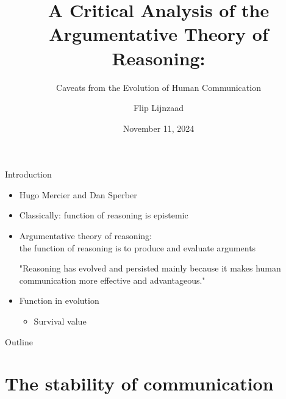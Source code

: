 \documentclass[xcolor=table]{beamer}       %
\title{A Critical Analysis of the Argumentative Theory of Reasoning:}
\subtitle{Caveats from the Evolution of Human Communication}
\author{Flip Lijnzaad}
\date{November 11, 2024}
\begin{document}
\maketitle

\begin{frame}{Introduction}
    \begin{itemize}
        \item Hugo Mercier and Dan Sperber
        \item Classically: function of reasoning is epistemic
        \item \alert{Argumentative} theory of reasoning:
            \\ the function of reasoning is to produce and evaluate arguments
    \begin{block}{\citet[p.~60]{MS11}}
        "Reasoning has evolved and persisted mainly because it makes human communication more effective and advantageous."
    \end{block}
    \end{itemize}
    \pause
    \begin{itemize}
        \item Function in evolution
            \begin{itemize}
                \item Survival value
            \end{itemize}
    \end{itemize}
\end{frame}

\begin{frame}{Outline}
    \tableofcontents
\end{frame}

\section{The stability of communication}
\end{document}
